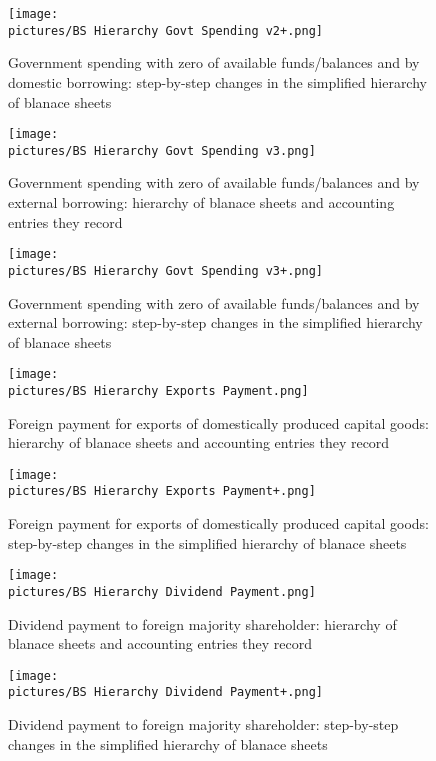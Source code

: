 {\newpage

\begin{figure}
\centering
\texttt{[image: \\pictures/BS Hierarchy Govt Spending v2+.png]}
\caption{Government spending with zero of available funds/balances and by domestic borrowing: step-by-step changes in the simplified hierarchy of blanace sheets}
\label{fig:bs_hierarchy_govt_spending1_}
\end{figure}

\newpage

\begin{figure}
\centering
\texttt{[image: \\pictures/BS Hierarchy Govt Spending v3.png]}
\caption{Government spending with zero of available funds/balances and by external borrowing: hierarchy of blanace sheets and accounting entries they record}
\label{fig:bs_hierarchy_govt_spending3}
\end{figure}

\newpage

\begin{figure}
\centering
\texttt{[image: \\pictures/BS Hierarchy Govt Spending v3+.png]}
\caption{Government spending with zero of available funds/balances and by external borrowing: step-by-step changes in the simplified hierarchy of blanace sheets}
\label{fig:bs_hierarchy_govt_spending3_}
\end{figure}

\newpage

\begin{figure}
\centering
\texttt{[image: \\pictures/BS Hierarchy Exports Payment.png]}
\caption{Foreign payment for exports of domestically produced capital goods: hierarchy of blanace sheets and accounting entries they record}
\label{fig:bs_hierarchy_exports_payment}
\end{figure}

\newpage

\begin{figure}
\centering
\texttt{[image: \\pictures/BS Hierarchy Exports Payment+.png]}
\caption{Foreign payment for exports of domestically produced capital goods: step-by-step changes in the simplified hierarchy of blanace sheets}
\label{fig:bs_hierarchy_exports_payment_}
\end{figure}

\newpage

\begin{figure}
\centering
\texttt{[image: \\pictures/BS Hierarchy Dividend Payment.png]}
\caption{Dividend payment to foreign majority shareholder: hierarchy of blanace sheets and accounting entries they record}
\label{fig:bs_hierarchy_dividend_payment}
\end{figure}

\newpage

\begin{figure}[!htbp]
\centering
\texttt{[image: \\pictures/BS Hierarchy Dividend Payment+.png]}
\caption{Dividend payment to foreign majority shareholder: step-by-step changes in the simplified hierarchy of blanace sheets}
\label{fig:bs_hierarchy_dividend_payment_}
\end{figure}

} %